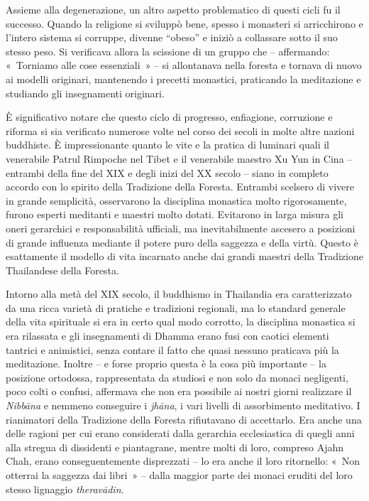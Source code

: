 Assieme alla degenerazione, un altro aspetto problematico di questi
cicli fu il successo. Quando la religione si sviluppò bene, spesso i
monasteri si arricchirono e l'intero sistema si corruppe, divenne
``obeso'' e iniziò a collassare sotto il suo stesso peso. Si verificava
allora la scissione di un gruppo che -- affermando: «~Torniamo alle cose
essenziali~» -- si allontanava nella foresta e tornava di nuovo ai
modelli originari, mantenendo i precetti monastici, praticando la
meditazione e studiando gli insegnamenti originari.

È significativo notare che questo ciclo di progresso, enfiagione,
corruzione e riforma si sia verificato numerose volte nel corso dei
secoli in molte altre nazioni buddhiste. È impressionante quanto le vite
e la pratica di luminari quali il venerabile Patrul Rimpoche nel Tibet e
il venerabile maestro Xu Yun in Cina -- entrambi della fine del XIX e
degli inizi del XX secolo -- siano in completo accordo con lo spirito
della Tradizione della Foresta. Entrambi scelsero di vivere in grande
semplicità, osservarono la disciplina monastica molto rigorosamente,
furono esperti meditanti e maestri molto dotati. Evitarono in larga
misura gli oneri gerarchici e responsabilità ufficiali, ma
inevitabilmente ascesero a posizioni di grande influenza mediante il
potere puro della saggezza e della virtù. Questo è esattamente il
modello di vita incarnato anche dai grandi maestri della Tradizione
Thailandese della Foresta.

Intorno alla metà del XIX secolo, il buddhismo in Thailandia era
caratterizzato da una ricca varietà di pratiche e tradizioni regionali,
ma lo standard generale della vita spirituale si era in certo qual modo
corrotto, la disciplina monastica si era rilassata e gli insegnamenti di
Dhamma erano fusi con caotici elementi tantrici e animistici, senza
contare il fatto che quasi nessuno praticava più la meditazione. Inoltre
-- e forse proprio questa è la cosa più importante -- la posizione
ortodossa, rappresentata da studiosi e non solo da monaci negligenti,
poco colti o confusi, affermava che non era possibile ai nostri giorni
realizzare il \emph{Nibbāna} e nemmeno conseguire i \emph{jhāna}, i vari
livelli di assorbimento meditativo. I rianimatori della Tradizione della
Foresta rifiutavano di accettarlo. Era anche una delle ragioni per cui
erano considerati dalla gerarchia ecclesiastica di quegli anni alla
stregua di dissidenti e piantagrane, mentre molti di loro, compreso
Ajahn Chah, erano conseguentemente disprezzati -- lo era anche il loro
ritornello: «~Non otterrai la saggezza dai libri~» -- dalla maggior
parte dei monaci eruditi del loro stesso lignaggio \emph{theravādin}.

